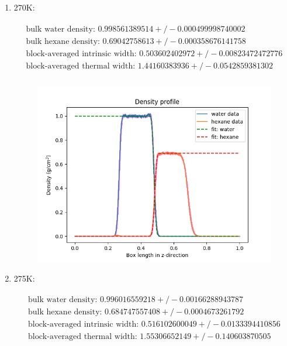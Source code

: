 \documentclass[12pt,reqno]{amsart}
\numberwithin{equation}{section}
\begin{document}
\begin{enumerate}
\item 270K:

\begin{align}
\begin{split}
\text{bulk water density: } 0.998561389514  +/- 0.000499998740002 \\
\text{bulk hexane density: } 0.69042758613  +/- 0.000358676141758\\
\text{block-averaged intrinsic width: } 0.503602402972  +/- 0.00823472472776\\
\text{block-averaged thermal width: } 1.44160383936  +/- 0.0542859381302 \\
\end{split}
\end{align} 

\begin{figure}[H]
\centering
\includegraphics[scale=0.6]{interface_density_profile_full-270-1bead}
\end{figure}

\item 275K:

\begin{align}
\begin{split}
\text{bulk water density: } 0.996016559218  +/- 0.00166288943787 \\
\text{bulk hexane density: } 0.684747557408  +/- 0.0004673261792\\
\text{block-averaged intrinsic width: } 0.516102600049  +/- 0.0133394410856\\
\text{block-averaged thermal width: } 1.55306652149  +/- 0.140603870505 \\
\end{split}
\end{align} 


\end{enumerate}
\end{document}
